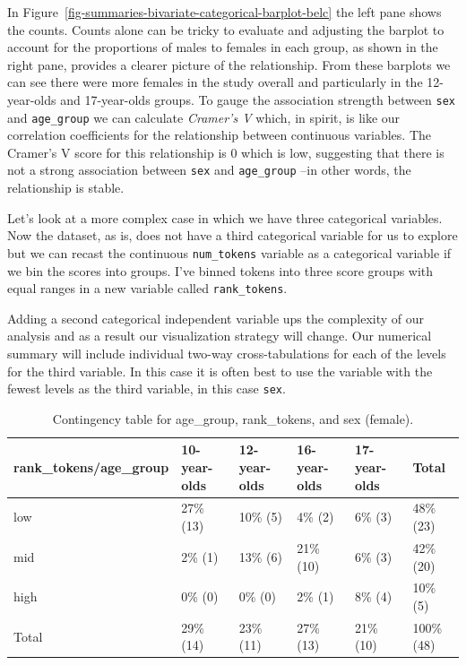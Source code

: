 \documentclass[
  letterpaper,
]{latex/krantz}
\begin{document}
In Figure~\ref{fig-summaries-bivariate-categorical-barplot-belc} the
left pane shows the counts. Counts alone can be tricky to evaluate and
adjusting the barplot to account for the proportions of males to females
in each group, as shown in the right pane, provides a clearer picture of
the relationship. From these barplots we can see there were more females
in the study overall and particularly in the 12-year-olds and
17-year-olds groups. To gauge the association strength between
\texttt{sex} and \texttt{age\_group} we can calculate \emph{Cramer's V}
which, in spirit, is like our correlation coefficients for the
relationship between continuous variables. The Cramer's V score for this
relationship is 0 which is low, suggesting that there is not a strong
association between \texttt{sex} and \texttt{age\_group} --in other
words, the relationship is stable.

Let's look at a more complex case in which we have three categorical
variables. Now the dataset, as is, does not have a third categorical
variable for us to explore but we can recast the continuous
\texttt{num\_tokens} variable as a categorical variable if we bin the
scores into groups. I've binned tokens into three score groups with
equal ranges in a new variable called \texttt{rank\_tokens}.

Adding a second categorical independent variable ups the complexity of
our analysis and as a result our visualization strategy will change. Our
numerical summary will include individual two-way cross-tabulations for
each of the levels for the third variable. In this case it is often best
to use the variable with the fewest levels as the third variable, in
this case \texttt{sex}.

\hypertarget{tbl-summaries-multivariate-categorical-table-belc-female}{}
\begin{table}
\caption{\label{tbl-summaries-multivariate-categorical-table-belc-female}Contingency table for age\_group, rank\_tokens, and sex (female). }\tabularnewline

\centering
\begin{tabular}{llllll}
\toprule
rank\_tokens/age\_group & 10-year-olds & 12-year-olds & 16-year-olds & 17-year-olds & Total\\
\midrule
low & 27\% (13) & 10\%  (5) & 4\%  (2) & 6\%  (3) & 48\% (23)\\
mid & 2\%  (1) & 13\%  (6) & 21\% (10) & 6\%  (3) & 42\% (20)\\
high & 0\%  (0) & 0\%  (0) & 2\%  (1) & 8\%  (4) & 10\%  (5)\\
Total & 29\% (14) & 23\% (11) & 27\% (13) & 21\% (10) & 100\% (48)\\
\bottomrule
\end{tabular}
\end{table}
\end{document}
